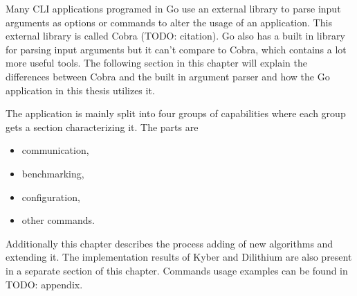 Many CLI applications programed in Go use an external library to parse input arguments as options or commands to alter the usage of an application. This external library is called Cobra (TODO: citation). Go also has a built in library for parsing input arguments but it can't compare to Cobra, which contains a lot more useful tools. The following section in this chapter will explain the differences between Cobra and the built in argument parser and how the Go application in this thesis utilizes it.

The application is mainly split into four groups of capabilities where each group gets a section characterizing it. The parts are
\begin{itemize}
  \item communication,
  \item benchmarking,
  \item configuration,
  \item other commands.
\end{itemize}
\noindent Additionally this chapter describes the process adding of new algorithms and extending it. The implementation results of Kyber and Dilithium are also present in a separate section of this chapter. Commands usage examples can be found in TODO: appendix.


